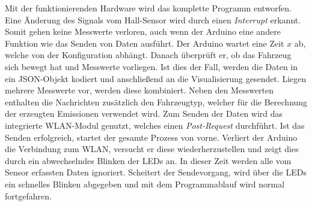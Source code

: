 \documentclass[.../Dokumentation.tex]{subfiles}
\begin{document}
    Mit der funktionierenden Hardware wird das komplette Programm entworfen. Eine Änderung des Signals vom Hall-Sensor wird durch einen \emph{Interrupt} erkannt. Somit gehen keine Messwerte verloren, auch wenn der Arduino eine andere Funktion wie das Senden von Daten ausführt. Der Arduino wartet eine Zeit $x$ ab, welche von der Konfiguration abhängt. Danach überprüft er, ob das Fahrzeug sich bewegt hat und Messwerte vorliegen. Ist dies der Fall, werden die Daten in ein JSON-Objekt kodiert und anschließend an die Visualisierung gesendet. Liegen mehrere Messwerte vor, werden diese kombiniert. Neben den Messwerten enthalten die Nachrichten zusätzlich den Fahrzeugtyp, welcher für die Berechnung der erzeugten Emissionen verwendet wird. Zum Senden der Daten wird das integrierte WLAN-Modul genutzt, welches einen \emph{Post-Request} durchführt. 
   	Ist das Senden erfolgreich, startet der gesamte Prozess von vorne. Verliert der Arduino die Verbindung zum WLAN, versucht er diese wiederherzustellen und zeigt dies durch ein abwechselndes Blinken der LEDs an. In dieser Zeit werden alle vom Sensor erfassten Daten ignoriert. Scheitert der Sendevorgang, wird über die LEDs ein schnelles  Blinken abgegeben und mit dem Programmablauf wird normal fortgefahren. 
\end{document}
